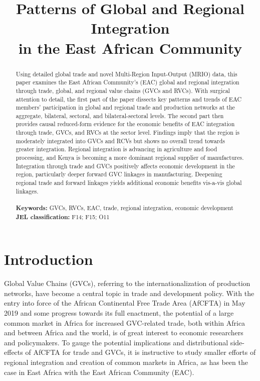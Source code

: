 \documentclass[a4paper]{article}
\title{\textbf{Patterns of Global and Regional Integration\\ in the East African Community}}
\date{}
\begin{document}
\maketitle


\begin{abstract} 
Using detailed global trade and novel Multi-Region Input-Output (MRIO) data, this paper examines the East African Community's (EAC) global and regional integration through trade, global, and regional value chains (GVCs and RVCs). With surgical attention to detail, the first part of the paper dissects key patterns and trends of EAC members' participation in global and regional trade and production networks at the aggregate, bilateral, sectoral, and bilateral-sectoral levels. The second part then provides causal reduced-form evidence for the economic benefits of EAC integration through trade, GVCs, and RVCs at the sector level. Findings imply that the region is moderately integrated into GVCs and RCVs but shows no overall trend towards greater integration. Regional integration is advancing in agriculture and food processing, and Kenya is becoming a more dominant regional supplier of manufactures. Integration through trade and GVCs positively affects economic development in the region, particularly deeper forward GVC linkages in manufacturing. Deepening regional trade and forward linkages yields additional economic benefits vis-a-vis global linkages. \\\\
\noindent \textbf{Keywords:} GVCs, RVCs, EAC, trade, regional integration, economic development\\
\textbf{JEL classification:} F14; F15; O11
\end{abstract}



\section{Introduction}

Global Value Chains (GVCs), referring to the internationalization of production networks, have become a central topic in trade and development policy. With the entry into force of the African Continental Free Trade Area (AfCFTA) in May 2019 and some progress towards its full enactment, the potential of a large common market in Africa for increased GVC-related trade, both within Africa and between Africa and the world, is of great interest to economic researchers and policymakers. To gauge the potential implications and distributional side-effects of AfCFTA for trade and GVCs, it is instructive to study smaller efforts of regional integration and creation of common markets in Africa, as has been the case in East Africa with the East African Community (EAC). \newline 
\end{document}
